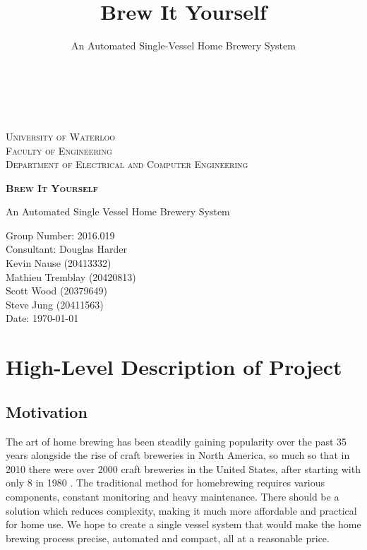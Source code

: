 \documentclass{article}
\author{\\\\}
\title{Brew It Yourself}
\subtitle{An Automated Single-Vessel Home Brewery System}
\begin{document}
\begin{titlepage}
    \begin{center}
        \vspace*{1cm}
        
        \textsc{\LARGE University of Waterloo}\\ [0.1cm]
        \textsc{\Large Faculty of Engineering}\\
        \textsc{Department of Electrical and Computer Engineering}

		\vspace{4.5cm}

        \textsc{\Huge \textbf{Brew It Yourself}}
        
        \vspace{0.2cm}
        An Automated Single Vessel Home Brewery System
                
        \vfill
        
        Group Number: 2016.019
		\\Consultant: Douglas Harder
        \vspace{0.5cm}
        \\Kevin Nause (20413332) 
        \\Mathieu Tremblay (20420813) 
        \\Scott Wood (20379649) 
        \\Steve Jung (20411563) 
        \vspace{0.5cm}
        \\Date: \today
        \vspace{3.0cm}
    \end{center}
\end{titlepage}

\pagebreak
\tableofcontents
\pagebreak
\justify
\onehalfspacing
\section{High-Level Description of Project}
\subsection{Motivation}
The art of home brewing has been steadily gaining popularity over the past 35 years alongside the rise of craft breweries in North America, so much so that in 2010 there were over 2000 craft breweries in the United States, after starting with only 8 in 1980 \cite{craft-beer}. The traditional method for homebrewing requires various components, constant monitoring and heavy maintenance. There should be a solution which reduces complexity, making it much more affordable and practical for home use. We hope to create a single vessel system that would make the home brewing process precise, automated and compact, all at a reasonable price.
\end{document}
